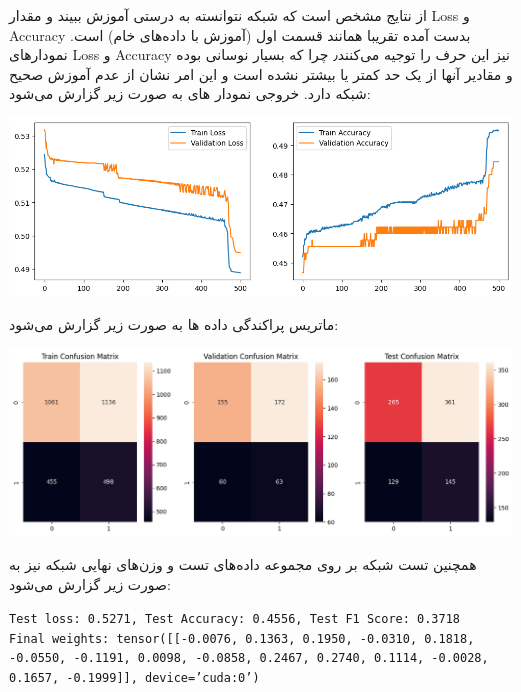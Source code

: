 \begin{enumerate}
\begin{qsolve}
از نتایج مشخص است که شبکه نتوانسته به درستی آموزش ببیند و مقدار Loss و Accuracy بدست آمده تقریبا همانند قسمت اول (آموزش با داده‌های خام) است. نمودار‌های Loss و Accuracy نیز این حرف را توجیه می‌کنند٫ چرا که بسیار نوسانی بوده و مقادیر آنها از یک حد کمتر یا بیشتر نشده است و این امر نشان از عدم آموزش صحیح شبکه دارد. خروجی نمودار های به صورت زیر گزارش می‌شود:

	\begin{center}
		\includegraphics*[width=1\linewidth]{pics/img16.png}
		\label{نمودار‌های خطا و دقت ۴}
	\end{center}
	
	ماتریس پراکندگی داده ها به صورت زیر گزارش می‌شود:
	
	\begin{center}
		\includegraphics*[width=1\linewidth]{pics/img17.png}
		\label{ماتریس پراکندگی ۴}
	\end{center}
	
	همچنین تست شبکه بر روی مجموعه داده‌های تست و وزن‌های نهایی شبکه نیز به صورت زیر گزارش می‌شود:
	
	\begin{latin}
		\texttt{Test loss: 0.5271, Test Accuracy: 0.4556, Test F1 Score: 0.3718}\\
		\texttt{Final weights: tensor([[-0.0076,  0.1363,  0.1950, -0.0310,  0.1818, -0.0550, -0.1191,  0.0098, -0.0858,  0.2467,  0.2740,  0.1114, -0.0028,  0.1657, -0.1999]], device='cuda:0')}\\
	\end{latin}
		
		
		
		
		
		
	\end{qsolve}
	
	
	
	
	
	
	
	
	
	
\end{enumerate}
